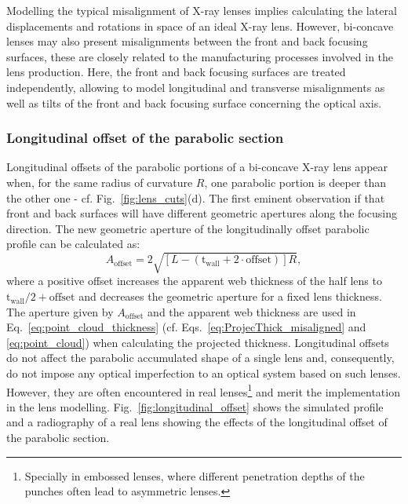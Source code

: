 \begin{refsection}
Modelling the typical misalignment of X-ray lenses implies calculating the lateral displacements and rotations in space of an ideal X-ray lens. However, bi-concave lenses may also present misalignments between the front and back focusing surfaces, these are closely related to the manufacturing processes involved in the lens production. Here, the front and back focusing surfaces are treated independently, allowing to model longitudinal and transverse misalignments as well as tilts of the front and back focusing surface concerning the optical axis.


\subsubsection*{Longitudinal offset of the parabolic section}
Longitudinal offsets of the parabolic portions of a bi-concave X-ray lens appear when, for the same radius of curvature $R$, one parabolic portion is deeper than the other one - cf. Fig.~\ref{fig:lens_cuts}(d). The first eminent observation if that front and back surfaces will have different geometric apertures along the focusing direction. The new geometric aperture of the longitudinally offset parabolic profile can be calculated as:
\begin{equation}\label{eq:A_2}
    A_{\text{offset}} = 2\sqrt{[L-(\text{t}_\text{wall}+2\cdot\text{offset})]R},
\end{equation}{}
where a positive offset increases the apparent web thickness of the half lens to $\text{t}_\text{wall}/2+\text{offset}$ and decreases the geometric aperture for a fixed lens thickness. The aperture given by $ A_{\text{offset}}$ and the apparent web thickness are used in Eq.~\ref{eq:point_cloud_thickness} (cf. Eqs.~\ref{eq:ProjecThick_misaligned} and \ref{eq:point_cloud}) when calculating the projected thickness.
Longitudinal offsets do not affect the parabolic accumulated shape of a single lens and, consequently, do not impose any optical imperfection to an optical system based on such lenses. However, they are often encountered in real lenses\footnote{Specially in embossed lenses, where different penetration depths of the punches often lead to asymmetric lenses.} and merit the implementation in the lens modelling. Fig.~\ref{fig:longitudinal_offset} shows the simulated profile and a radiography of a real lens showing the effects of the longitudinal offset of the parabolic section.


\end{refsection}
